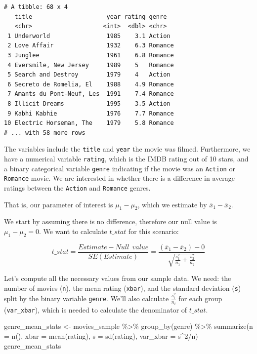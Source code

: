 \documentclass[
  letterpaper,
  DIV=11,
  numbers=noendperiod]{scrreprt}
\newenvironment{Shaded}{\begin{snugshade}}{\end{snugshade}}
\newcommand{\AttributeTok}[1]{\textcolor[rgb]{0.40,0.45,0.13}{#1}}
\newcommand{\DecValTok}[1]{\textcolor[rgb]{0.68,0.00,0.00}{#1}}
\newcommand{\FunctionTok}[1]{\textcolor[rgb]{0.28,0.35,0.67}{#1}}
\newcommand{\NormalTok}[1]{\textcolor[rgb]{0.00,0.23,0.31}{#1}}
\newcommand{\OtherTok}[1]{\textcolor[rgb]{0.00,0.23,0.31}{#1}}
\newcommand{\SpecialCharTok}[1]{\textcolor[rgb]{0.37,0.37,0.37}{#1}}
\theoremstyle{definition}
\theoremstyle{remark}
\begin{document}
\begin{verbatim}
# A tibble: 68 x 4
   title                     year rating genre  
   <chr>                    <int>  <dbl> <chr>  
 1 Underworld                1985    3.1 Action 
 2 Love Affair               1932    6.3 Romance
 3 Junglee                   1961    6.8 Romance
 4 Eversmile, New Jersey     1989    5   Romance
 5 Search and Destroy        1979    4   Action 
 6 Secreto de Romelia, El    1988    4.9 Romance
 7 Amants du Pont-Neuf, Les  1991    7.4 Romance
 8 Illicit Dreams            1995    3.5 Action 
 9 Kabhi Kabhie              1976    7.7 Romance
10 Electric Horseman, The    1979    5.8 Romance
# ... with 58 more rows
\end{verbatim}

The variables include the \texttt{title} and \texttt{year} the movie was
filmed. Furthermore, we have a numerical variable \texttt{rating}, which
is the IMDB rating out of 10 stars, and a binary categorical variable
\texttt{genre} indicating if the movie was an \texttt{Action} or
\texttt{Romance} movie. We are interested in whether there is a
difference in average ratings between the \texttt{Action} and
\texttt{Romance} genres.

That is, our parameter of interest is \(\mu_1 - \mu_2\), which we
estimate by \(\bar{x}_1 - \bar{x}_2\).

We start by assuming there is no difference, therefore our null value is
\(\mu_1 - \mu_2 = 0\). We want to calculate \(t\_stat\) for this
scenario:

\[t\_stat = \frac{Estimate - Null \ \ value}{SE(Estimate)} = \frac{(\bar{x}_1 - \bar{x}_2) - 0}{\sqrt{\frac{s_1^2}{n_1} + \frac{s_2^2}{n_2}}}\]

Let's compute all the necessary values from our sample data. We need:
the number of movies (\texttt{n}), the mean rating (\texttt{xbar}), and
the standard deviation (\texttt{s}) split by the binary variable
\texttt{genre}. We'll also calculate \(\frac{s_i^2}{n_i}\) for each
group (\texttt{var\_xbar}), which is needed to calculate the denominator
of \(t\_stat\).

\begin{Shaded}
\begin{Highlighting}[]
\NormalTok{genre\_mean\_stats }\OtherTok{\textless{}{-}}\NormalTok{ movies\_sample }\SpecialCharTok{\%\textgreater{}\%} 
  \FunctionTok{group\_by}\NormalTok{(genre) }\SpecialCharTok{\%\textgreater{}\%} 
  \FunctionTok{summarize}\NormalTok{(}\AttributeTok{n =} \FunctionTok{n}\NormalTok{(), }
            \AttributeTok{xbar =} \FunctionTok{mean}\NormalTok{(rating), }
            \AttributeTok{s =} \FunctionTok{sd}\NormalTok{(rating),}
            \AttributeTok{var\_xbar =}\NormalTok{ s}\SpecialCharTok{\^{}}\DecValTok{2}\SpecialCharTok{/}\NormalTok{n)}
\NormalTok{genre\_mean\_stats}
\end{Highlighting}
\end{Shaded}
\end{document}
